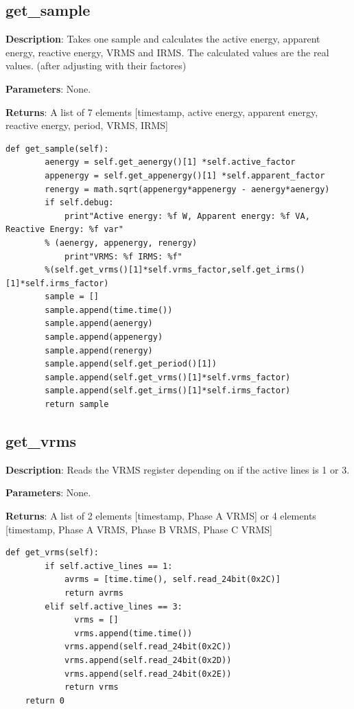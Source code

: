 \documentclass{scrartcl}  %
\begin{document}
\subsection{get_sample}	

\textbf{Description}: Takes one sample and calculates the active energy, apparent energy, reactive energy, VRMS and IRMS. The calculated values are the real values. (after adjusting with their factores)

\textbf{Parameters}: None.

\textbf{Returns}: A list of 7 elements [timestamp, active energy, apparent energy, reactive energy, period, VRMS, IRMS]

\begin{lstlisting}	
def get_sample(self):
    	aenergy = self.get_aenergy()[1] *self.active_factor
    	appenergy = self.get_appenergy()[1] *self.apparent_factor 
    	renergy = math.sqrt(appenergy*appenergy - aenergy*aenergy)
    	if self.debug:
    		print"Active energy: %f W, Apparent energy: %f VA, Reactive Energy: %f var" 
		% (aenergy, appenergy, renergy)
    		print"VRMS: %f IRMS: %f" 
		%(self.get_vrms()[1]*self.vrms_factor,self.get_irms()[1]*self.irms_factor)
    	sample = []
    	sample.append(time.time())
    	sample.append(aenergy)
    	sample.append(appenergy)
    	sample.append(renergy)
    	sample.append(self.get_period()[1])
    	sample.append(self.get_vrms()[1]*self.vrms_factor)
    	sample.append(self.get_irms()[1]*self.irms_factor)
    	return sample
\end{lstlisting}
		
\subsection{get_vrms}

\textbf{Description}: Reads the VRMS register depending on if the active lines is 1 or 3.

\textbf{Parameters}: None.

\textbf{Returns}: A list of 2 elements [timestamp, Phase A VRMS] or 4 elements [timestamp, Phase A VRMS, Phase B VRMS, Phase C VRMS]

\begin{lstlisting}
def get_vrms(self):
    	if self.active_lines == 1:
    		avrms = [time.time(), self.read_24bit(0x2C)]
    		return avrms
    	elif self.active_lines == 3:
              vrms = []
              vrms.append(time.time())
    		vrms.append(self.read_24bit(0x2C))
    		vrms.append(self.read_24bit(0x2D))
    		vrms.append(self.read_24bit(0x2E))
    		return vrms
	return 0
\end{lstlisting}
		
\end{document}
